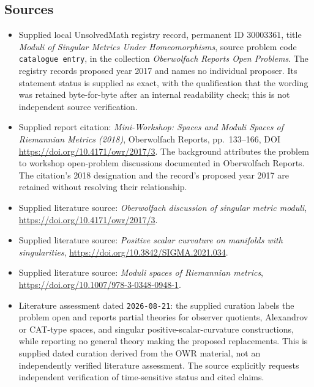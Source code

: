 \documentclass[11pt]{article}
\begin{document}
\subsection{Sources}
\begin{itemize}
\item Supplied local UnsolvedMath registry record, permanent ID \(30003361\), title \emph{Moduli of Singular Metrics Under Homeomorphisms}, source problem code \texttt{catalogue entry}, in the collection \emph{Oberwolfach Reports Open Problems}. The registry records proposed year 2017 and names no individual proposer. Its statement status is supplied as exact, with the qualification that the wording was retained byte-for-byte after an internal readability check; this is not independent source verification.
\item Supplied report citation: \emph{Mini-Workshop: Spaces and Moduli Spaces of Riemannian Metrics (2018)}, Oberwolfach Reports, pp.\ 133--166, DOI \url{https://doi.org/10.4171/owr/2017/3}. The background attributes the problem to workshop open-problem discussions documented in Oberwolfach Reports. The citation's 2018 designation and the record's proposed year 2017 are retained without resolving their relationship.
\item Supplied literature source: \emph{Oberwolfach discussion of singular metric moduli}, \url{https://doi.org/10.4171/owr/2017/3}.
\item Supplied literature source: \emph{Positive scalar curvature on manifolds with singularities}, \url{https://doi.org/10.3842/SIGMA.2021.034}.
\item Supplied literature source: \emph{Moduli spaces of Riemannian metrics}, \url{https://doi.org/10.1007/978-3-0348-0948-1}.
\item Literature assessment dated \texttt{2026-08-21}: the supplied curation labels the problem open and reports partial theories for observer quotients, Alexandrov or CAT-type spaces, and singular positive-scalar-curvature constructions, while reporting no general theory making the proposed replacements. This is supplied dated curation derived from the OWR material, not an independently verified literature assessment. The source explicitly requests independent verification of time-sensitive status and cited claims.
\end{itemize}
\end{document}
